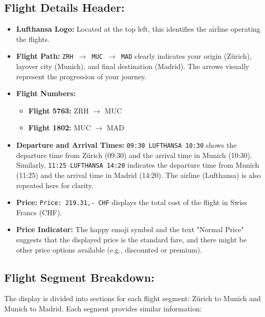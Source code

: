\documentclass[a4paper]{article}
\begin{document}
\subsection{Flight Details Header: }
\begin{itemize}
    \item \textbf{Lufthansa Logo:} Located at the top left, this identifies the airline operating the flights.
    \item \textbf{Flight Path:} \texttt{ZRH $\longrightarrow$ MUC $\longrightarrow$ MAD} clearly indicates your origin (Zürich), layover city (Munich), and final destination (Madrid). The arrows visually represent the progression of your journey.
    \item \textbf{Flight Numbers:}
    \begin{itemize}
        \item \textbf{Flight 5763:} ZRH $\longrightarrow$ MUC
        \item \textbf{Flight 1802:} MUC $\longrightarrow$ MAD
    \end{itemize}
    \item \textbf{Departure and Arrival Times:} \texttt{09:30 LUFTHANSA 10:30} shows the departure time from Zürich (09:30) and the arrival time in Munich (10:30). Similarly, \texttt{11:25 LUFTHANSA 14:20} indicates the departure time from Munich (11:25) and the arrival time in Madrid (14:20). The airline (Lufthansa) is also repeated here for clarity.
    \item \textbf{Price:} \texttt{Price: 219.31,- CHF} displays the total cost of the flight in Swiss Francs (CHF).
    \item \textbf{Price Indicator:} The happy emoji symbol and the text "Normal Price" suggests that the displayed price is the standard fare, and there might be other price options available (e.g., discounted or premium).
\end{itemize}

\subsection{Flight Segment Breakdown: }
The display is divided into sections for each flight segment: Zürich to Munich and Munich to Madrid. Each segment provides similar information:
\end{document}
